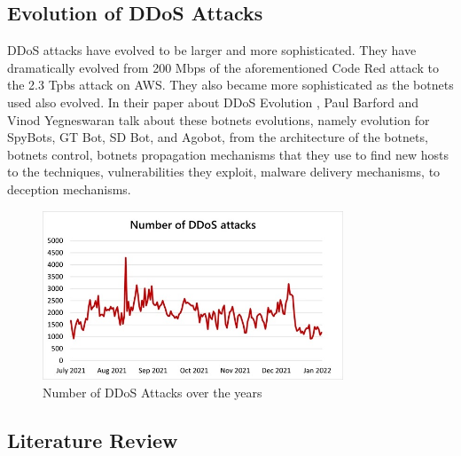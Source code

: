 \documentclass[a4paper, 12pt]{report} %
\begin{document}
        \subsection{Evolution of DDoS Attacks}
            DDoS attacks have evolved to be larger and more sophisticated. They have dramatically evolved from 200 Mbps \cite{ddos_evolution} of the aforementioned Code Red attack to the 2.3 Tpbs attack on AWS. They also became more sophisticated as the botnets used also evolved. In their paper about DDoS Evolution \cite{ddos_evolution}, Paul Barford and Vinod Yegneswaran talk about these botnets evolutions, namely evolution for SpyBots, GT Bot, SD Bot, and Agobot, from the architecture of the botnets, botnets control, botnets propagation mechanisms that they use to find new hosts to the techniques, vulnerabilities they exploit, malware delivery mechanisms, to deception mechanisms. 

            \begin{figure}[h!]
                \centering
                \includegraphics[width=0.8\textwidth]{Images/68e2342a-9807-463e-9bc5-c873082ca2b6-2.jpeg}
                \caption{Number of DDoS Attacks over the years \cite{microsoftAzureDDoS}}
                \label{fig:ddos_evolution}
            \end{figure}

            \subsection{Literature Review}
\end{document}
